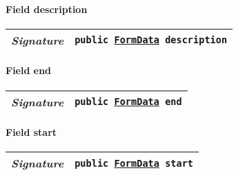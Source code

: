 \begin{adjustwidth}{1.5em}{0pt}
\begin{adjustwidth}{1.5em}{0pt}
\begin{adjustwidth}{1.5em}{0pt}
\begin{adjustwidth}{1.5em}{0pt}
{\begin{tabularx}{1.0\linewidth}{@{}l R@{}}
        \end{tabularx}}
      \end{adjustwidth}\paragraph{Field description\label{edu.kit.hci.soli.controller.BookingCreateController.FormData@description}}
      \begin{adjustwidth}{1.5em}{0pt}
        {\begin{tabularx}{1.0\linewidth}{@{}l R@{}}
          \emph{Signature} & \texttt{public \texttt{\hyperref[edu.kit.hci.soli.controller.BookingCreateController.FormData]{\texttt{FormData}}} description} \\
          \hline
  
        \end{tabularx}}
      \end{adjustwidth}\paragraph{Field end\label{edu.kit.hci.soli.controller.BookingCreateController.FormData@end}}
      \begin{adjustwidth}{1.5em}{0pt}
        {\begin{tabularx}{1.0\linewidth}{@{}l R@{}}
          \emph{Signature} & \texttt{public \texttt{\hyperref[edu.kit.hci.soli.controller.BookingCreateController.FormData]{\texttt{FormData}}} end} \\
          \hline
  
        \end{tabularx}}
      \end{adjustwidth}\paragraph{Field start\label{edu.kit.hci.soli.controller.BookingCreateController.FormData@start}}
      \begin{adjustwidth}{1.5em}{0pt}
        {\begin{tabularx}{1.0\linewidth}{@{}l R@{}}
          \emph{Signature} & \texttt{public \texttt{\hyperref[edu.kit.hci.soli.controller.BookingCreateController.FormData]{\texttt{FormData}}} start} \\
          \hline
  

\end{tabularx}}
\end{adjustwidth}
\end{adjustwidth}
\end{adjustwidth}
\end{adjustwidth}
